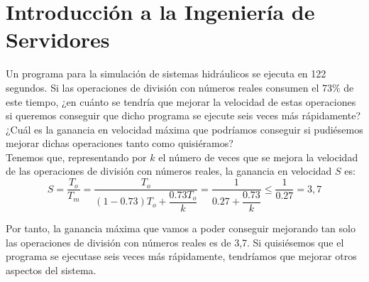 \section{Introducción a la Ingeniería de Servidores}

\begin{ejercicio}
Un programa para la simulación de sistemas hidráulicos se ejecuta en 122 segundos. Si las operaciones de división con números reales consumen el 73\% de este tiempo, ¿en cuánto se tendría que mejorar la velocidad de estas operaciones si queremos conseguir que dicho programa se ejecute seis veces más rápidamente? ¿Cuál es la ganancia en velocidad máxima que podríamos conseguir si pudiésemos mejorar dichas operaciones tanto como quisiéramos?\\

Tenemos que, representando por $k$ el número de veces que se mejora la velocidad de las operaciones de división con números reales, la ganancia en velocidad $S$ es:
\begin{equation*}
    S = \frac{T_o}{T_m} = \dfrac{T_o}{(1-0.73)T_o + \dfrac{0.73T_o}{k}}
    = \dfrac{1}{0.27 + \dfrac{0.73}{k}}\leq \dfrac{1}{0.27} = 3,7
\end{equation*}

Por tanto, la ganancia máxima que vamos a poder conseguir mejorando tan solo las operaciones de división con números reales es de 3,7. Si quisiésemos que el programa se ejecutase seis veces más rápidamente, tendríamos que mejorar otros aspectos del sistema.
\end{ejercicio}
\begin{comment}
SOLUCIÓN: El programa no se puede ejecutar seis veces más rápidamente actuando solamente sobre las operaciones de división de números reales. La ganancia en velocidad más alta que se conseguiría mejorando estas operaciones al máximo es 3,7.
\end{comment}

